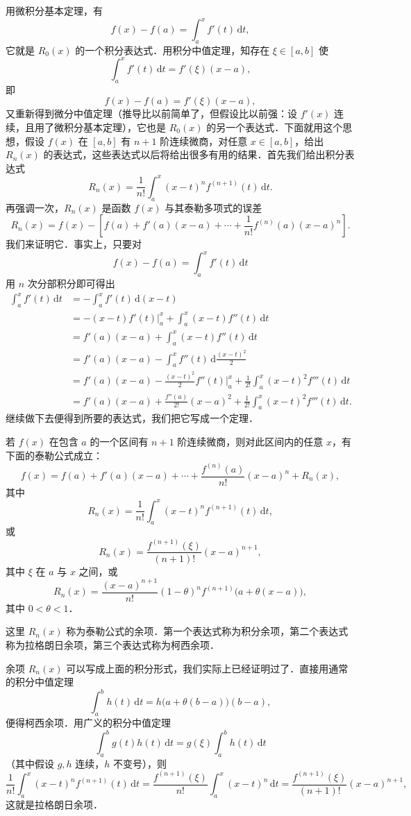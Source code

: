 用微积分基本定理，有
\[
f(x) - f(a) = \int_a^x f'(t)\,\mathrm{d}t,
\]
它就是 $R_0(x)$ 的一个积分表达式．用积分中值定理，知存在 $\xi \in [a, b]$ 使
\[
\int_a^x f'(t)\,\mathrm{d}t = f'(\xi)(x-a),
\]
即
\[
f(x) - f(a) = f'(\xi)(x-a),
\]
又重新得到微分中值定理（推导比以前简单了，但假设比以前强：设 $f'(x)$ 连续，且用了微积分基本定理），它也是 $R_0(x)$ 的另一个表达式．下面就用这个思想，假设 $f(x)$ 在 $[a,b]$ 有 $n+1$ 阶连续微商，对任意 $x \in [a,b]$，给出 $R_n(x)$ 的表达式，这些表达式以后将给出很多有用的结果．首先我们给出积分表达式
\[
R_n(x) = \frac{1}{n!}\int_a^x (x-t)^n f^{(n+1)}(t)\,\mathrm{d}t.
\]
再强调一次，$R_n(x)$ 是函数 $f(x)$ 与其泰勒多项式的误差
\[
R_n(x) = f(x) - \left[f(a) + f'(a)(x-a) + \cdots + \frac{1}{n!}f^{(n)}(a)(x-a)^n\right].
\]
我们来证明它．事实上，只要对
\[
f(x) - f(a) = \int_a^x f'(t)\,\mathrm{d}t
\]
用 $n$ 次分部积分即可得出
\begin{align*}
\int_a^x f'(t)\,\mathrm{d}t &= -\int_a^x f'(t)\,\mathrm{d}(x-t) \\
&= -(x-t)f'(t)\Big|_a^x + \int_a^x (x-t)f''(t)\,\mathrm{d}t \\
&= f'(a)(x-a) + \int_a^x (x-t)f''(t)\,\mathrm{d}t \\
&= f'(a)(x-a) - \int_a^x f''(t)\,\mathrm{d}\frac{(x-t)^2}{2} \\
&= f'(a)(x-a) - \frac{(x-t)^2}{2}f''(t)\Big|_a^x + \frac{1}{2!}\int_a^x (x-t)^2 f'''(t)\,\mathrm{d}t \\
&= f'(a)(x-a) + \frac{f''(a)}{2!}(x-a)^2 + \frac{1}{2!}\int_a^x (x-t)^2 f'''(t)\,\mathrm{d}t.
\end{align*}
继续做下去便得到所要的表达式，我们把它写成一个定理．

\begin{theorem}\label{thm:8-4}
若 $f(x)$ 在包含 $a$ 的一个区间有 $n+1$ 阶连续微商，则对此区间内的任意 $x$，有下面的泰勒公式成立：
\[
f(x) = f(a) + f'(a)(x-a) + \cdots + \frac{f^{(n)}(a)}{n!}(x-a)^n + R_n(x),
\]
其中
\[
R_n(x) = \frac{1}{n!}\int_a^x (x-t)^n f^{(n+1)}(t)\,\mathrm{d}t,
\]
或
\[
R_n(x) = \frac{f^{(n+1)}(\xi)}{(n+1)!}(x-a)^{n+1},
\]
其中 $\xi$ 在 $a$ 与 $x$ 之间，或
\[
R_n(x) = \frac{(x-a)^{n+1}}{n!}(1-\theta)^n f^{(n+1)}\big(a+\theta(x-a)\big),
\]
其中 $0 < \theta < 1$．
\end{theorem}

这里 $R_n(x)$ 称为泰勒公式的余项．第一个表达式称为积分余项，第二个表达式称为拉格朗日余项，第三个表达式称为柯西余项．

余项 $R_n(x)$ 可以写成上面的积分形式，我们实际上已经证明过了．直接用通常的积分中值定理
\[
\int_a^b h(t)\,\mathrm{d}t = h\big(a+\theta(b-a)\big)(b-a),
\]
便得柯西余项．用广义的积分中值定理
\[
\int_a^b g(t)h(t)\,\mathrm{d}t = g(\xi)\int_a^b h(t)\,\mathrm{d}t
\]
（其中假设 $g, h$ 连续，$h$ 不变号），则
\[
\frac{1}{n!}\int_a^x (x-t)^n f^{(n+1)}(t)\,\mathrm{d}t = \frac{f^{(n+1)}(\xi)}{n!}\int_a^x (x-t)^n\,\mathrm{d}t = \frac{f^{(n+1)}(\xi)}{(n+1)!}(x-a)^{n+1},
\]
这就是拉格朗日余项．

